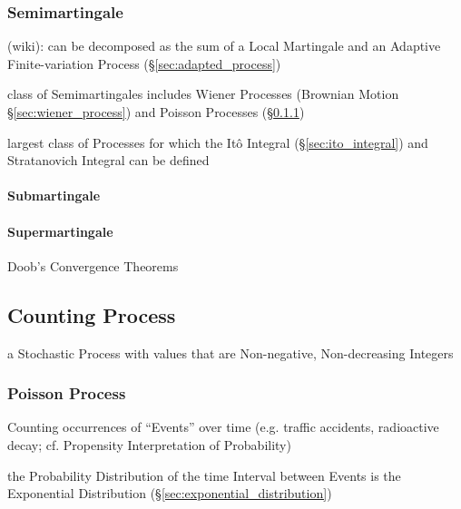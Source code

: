 \subsubsection{Semimartingale}\label{sec:semimartingale}

(wiki): can be decomposed as the sum of a Local Martingale and an Adaptive
Finite-variation Process (\S\ref{sec:adapted_process})

class of Semimartingales includes Wiener Processes (Brownian Motion
\S\ref{sec:wiener_process}) and Poisson Processes
(\S\ref{sec:poisson_process})

largest class of Processes for which the It\^o Integral
(\S\ref{sec:ito_integral}) and Stratanovich Integral can be defined



\paragraph{Submartingale}\label{sec:submartingale}\hfill

\paragraph{Supermartingale}\label{sec:supermartingale}\hfill

Doob's Convergence Theorems



\subsection{Counting Process}\label{sec:counting_process}

a Stochastic Process with values that are Non-negative, Non-decreasing Integers



\subsubsection{Poisson Process}\label{sec:poisson_process}

Counting occurrences of ``Events'' over time (e.g. traffic accidents,
radioactive decay; cf. Propensity Interpretation of Probability)

the Probability Distribution of the time Interval between Events is the
Exponential Distribution (\S\ref{sec:exponential_distribution})

